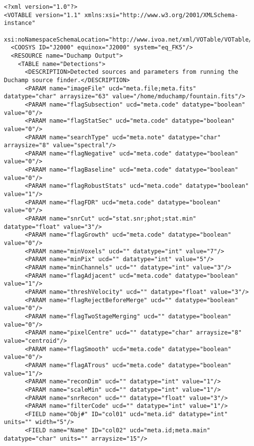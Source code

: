 {\tiny
  \begin{verbatim}
<?xml version="1.0"?>
<VOTABLE version="1.1" xmlns:xsi="http://www.w3.org/2001/XMLSchema-instance"
 xsi:noNamespaceSchemaLocation="http://www.ivoa.net/xml/VOTable/VOTable/v1.1">
  <COOSYS ID="J2000" equinox="J2000" system="eq_FK5"/>
  <RESOURCE name="Duchamp Output">
    <TABLE name="Detections">
      <DESCRIPTION>Detected sources and parameters from running the Duchamp source finder.</DESCRIPTION>
      <PARAM name="imageFile" ucd="meta.file;meta.fits" datatype="char" arraysize="63" value="/home/mduchamp/fountain.fits"/>
      <PARAM name="flagSubsection" ucd="meta.code" datatype="boolean" value="0"/>
      <PARAM name="flagStatSec" ucd="meta.code" datatype="boolean" value="0"/>
      <PARAM name="searchType" ucd="meta.note" datatype="char" arraysize="8" value="spectral"/>
      <PARAM name="flagNegative" ucd="meta.code" datatype="boolean" value="0"/>
      <PARAM name="flagBaseline" ucd="meta.code" datatype="boolean" value="0"/>
      <PARAM name="flagRobustStats" ucd="meta.code" datatype="boolean" value="1"/>
      <PARAM name="flagFDR" ucd="meta.code" datatype="boolean" value="0"/>
      <PARAM name="snrCut" ucd="stat.snr;phot;stat.min" datatype="float" value="3"/>
      <PARAM name="flagGrowth" ucd="meta.code" datatype="boolean" value="0"/>
      <PARAM name="minVoxels" ucd="" datatype="int" value="7"/>
      <PARAM name="minPix" ucd="" datatype="int" value="5"/>
      <PARAM name="minChannels" ucd="" datatype="int" value="3"/>
      <PARAM name="flagAdjacent" ucd="meta.code" datatype="boolean" value="1"/>
      <PARAM name="threshVelocity" ucd="" datatype="float" value="3"/>
      <PARAM name="flagRejectBeforeMerge" ucd="" datatype="boolean" value="0"/>
      <PARAM name="flagTwoStageMerging" ucd="" datatype="boolean" value="0"/>
      <PARAM name="pixelCentre" ucd="" datatype="char" arraysize="8" value="centroid"/>
      <PARAM name="flagSmooth" ucd="meta.code" datatype="boolean" value="0"/>
      <PARAM name="flagATrous" ucd="meta.code" datatype="boolean" value="1"/>
      <PARAM name="reconDim" ucd="" datatype="int" value="1"/>
      <PARAM name="scaleMin" ucd="" datatype="int" value="1"/>
      <PARAM name="snrRecon" ucd="" datatype="float" value="3"/>
      <PARAM name="filterCode" ucd="" datatype="int" value="1"/>
      <FIELD name="Obj#" ID="col01" ucd="meta.id" datatype="int" units="" width="5"/>
      <FIELD name="Name" ID="col02" ucd="meta.id;meta.main" datatype="char" units="" arraysize="15"/>

\end{verbatim}}
